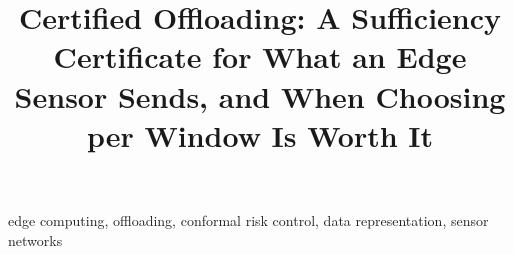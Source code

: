 \documentclass[conference]{IEEEtran}
\begin{document}
\title{Certified Offloading: A Sufficiency Certificate for What an Edge Sensor Sends,
and When Choosing per Window Is Worth It}

\author{
}

\maketitle

\begin{abstract}

\end{abstract}

\begin{IEEEkeywords}
edge computing, offloading, conformal risk control, data representation, sensor networks
\end{IEEEkeywords}













\end{document}

